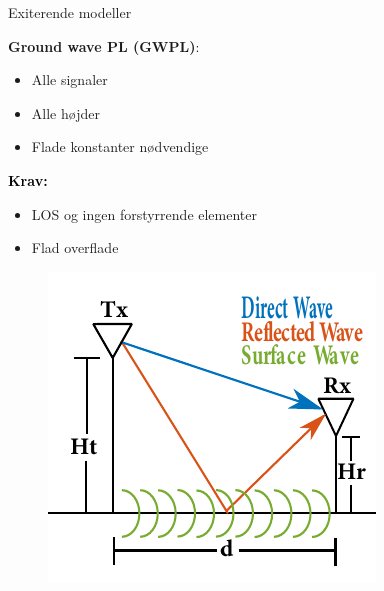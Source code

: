 \begin{frame}{Exiterende modeller}
\begin{minipage}{.45\textwidth}
\raggedright\textcolor{thomaspurple}{\textbf{Ground wave PL (GWPL)}:}
\begin{itemize}
\item Alle signaler
\item Alle højder
\item Flade konstanter nødvendige
\end{itemize} 

\vspace{1em}
\textcolor{black}{\textbf{Krav:}}
\begin{itemize}
\item LOS og ingen forstyrrende elementer
\item Flad overflade
\end{itemize}

\end{minipage}
\begin{minipage}{0.5\textwidth}
\begin{figure}[!htbp]
 \centering
  \includegraphics[width = \columnwidth]{figures/poster_cropped_1.pdf}
  \end{figure}
\end{minipage}


\end{frame}
